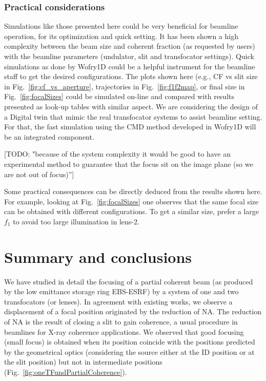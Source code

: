 \documentclass{iucr}              %
\newcommand{\todo}[1]{{\color{red}[TODO: "#1'']}}
\begin{document}
\subsubsection{Practical considerations} Simulations like those presented here could be very beneficial for beamline operation, for its optimization and quick setting.  It has been shown a high complexity between the beam size and coherent fraction (as requested by users) with the beamline parameters (undulator, slit and transfocator settings). Quick simulations as done by Wofry1D could be a helpful instrument for the beamline staff to get the desired configurations. The plots shown here (e.g., CF vs slit size in Fig.~\ref{fig:cf_vs_aperture}, trajectories in Fig.~\ref{fig:f1f2map}, or final size in Fig.~\ref{fig:focalSizes} could be simulated on-line and compared with results presented as look-up tables with similar aspect. We are considering the design of a Digital twin that mimic the real transfocator systems to assist beamline setting. For that, the fast simulation using the CMD method developed in Wofry1D will be an integrated component.  

\todo{because of the system complexity it would be good to have an experimental method to guarantee that the focus sit on the image plane (so we are not out of focus)}

Some practical consequences can be directly deduced from the results shown here. For example, looking at Fig.~\ref{fig:focalSizes} one observes that the same focal size can be obtained with different configurations. To get a similar size, prefer a large $f_1$ to avoid too large illumination in lens-2.




\section{Summary and conclusions}
\label{sec:summary}

We have studied in detail the focusing of a partial coherent beam (as produced by the low emittance storage ring EBS-ESRF) by a system of one and two transfocators (or lenses). In agreement with existing works, we observe a displacement of a focal position originated by the reduction of NA. The reduction of NA is the result of closing a slit to gain coherence, a usual procedure in beamlines for X-ray coherence applications. We observed that good focusing (small focus) is obtained when its position coincide with the positions predicted by the geometrical optics (considering the source either at the ID position or at the slit position) but not in intermediate positions (Fig.~\ref{fig:oneTFundPartialCoherence}).
\end{document}
